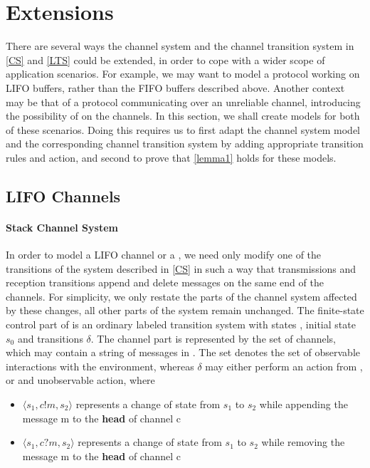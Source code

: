 \section{Extensions}
\label{extensions}
There are several ways the channel system and the channel transition system in \ref{CS} and \ref{LTS} could be extended, in order to cope with a wider scope of application scenarios. For example, we may want to model a protocol working on LIFO buffers, rather than the FIFO buffers described above. Another context may be that of a protocol communicating over an unreliable channel, introducing the possibility of  on the channels. In this section, we shall create models for both of these scenarios. Doing this requires us to first adapt the channel system model and the corresponding channel transition system by adding appropriate transition rules and action, and second to prove that \ref{lemma1} holds for these models.

\subsection{LIFO Channels}
\paragraph{Stack Channel System}
\label{StackCS}
In order to model a LIFO channel or a , we need only modify one of the transitions of the system described in \ref{CS} in such a way that transmissions and reception transitions append and delete messages on the same end of the channels. For simplicity, we only restate the parts of the channel system affected by these changes, all other parts of the system remain unchanged. The finite-state control part of  is an ordinary labeled transition system with states , initial state $s_0$ and transitions $\delta$. The channel part is represented by the set  of channels, which may contain a string of messages in . The set  denotes the set of observable interactions with the environment, whereas $\delta$ may either perform an action from , or and unobservable action, where

\begin{itemize}
\item[]
$\langle s_1, c!m, s_2\rangle$ represents a change of state from $s_1$ to $s_2$ while appending the message m to the \textbf{head} of channel c
\item[]
$\langle s_1, c?m, s_2\rangle$ represents a change of state from $s_1$ to $s_2$ while removing the message m to the \textbf{head} of channel c
\end{itemize}


